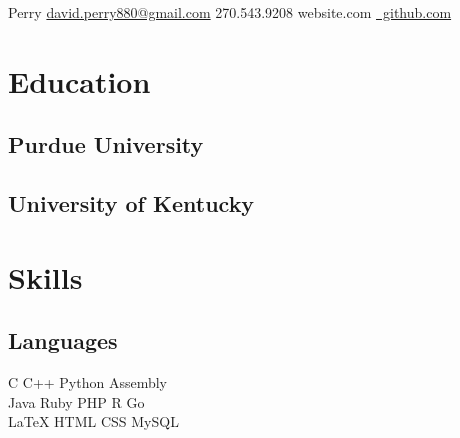 \documentclass[]{deedy-resume-openfont}
\begin{document}
%
%

%
%


	    {Perry}
	    {\href{mailto:david.perry880@gmail.com}{david.perry880@gmail.com}}
	    {270.543.9208}
	    {website.com}
	    {\href{www.github.com}{\faGithub \  github.com}}

%
%

\begin{minipage}[t]{0.33\textwidth} 


\section{Education} 

\subsection{Purdue University}
\sectionsep


\subsection{University of Kentucky}
\sectionsep


\section{Skills}
\subsection{Languages}
C \textbullet{}   C++ \textbullet{} Python \textbullet{} Assembly \\
Java \textbullet{} Ruby \textbullet{} PHP \textbullet{} R \textbullet{} Go \\
\LaTeX \textbullet{} HTML \textbullet{} CSS \textbullet{} MySQL
\sectionsep


\end{minipage}
\end{document}
